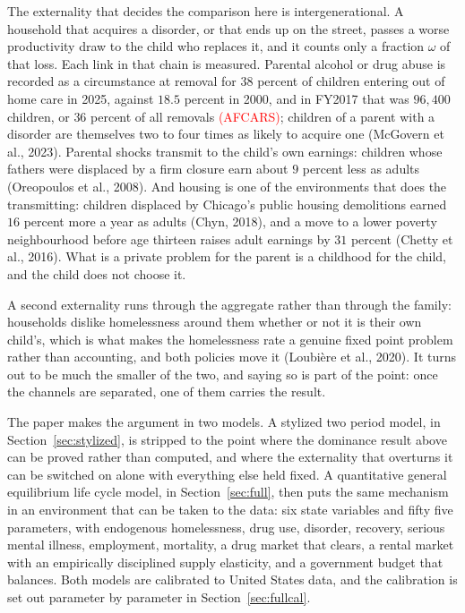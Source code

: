 \documentclass[10pt]{article}
\begin{document}
The externality that decides the comparison here is intergenerational. A
household that acquires a disorder, or that ends up on the street, passes a worse
productivity draw to the child who replaces it, and it counts only a fraction
$\omega$ of that loss. Each link in that chain is measured. Parental alcohol or
drug abuse is recorded as a circumstance at removal for $38$ percent of children
entering out of home care in 2025, against $18.5$ percent in 2000, and in FY2017
that was $96{,}400$ children, or $36$ percent of all removals \textcolor{red}{(AFCARS)}; children of a parent
with a disorder are themselves two to four times as likely to acquire one
(McGovern et al., 2023). Parental shocks transmit to the child's own earnings:
children whose fathers were displaced by a firm closure earn about $9$ percent
less as adults (Oreopoulos et al., 2008). And housing is one of the
environments that does the transmitting: children displaced by Chicago's public
housing demolitions earned $16$ percent more a year as adults (Chyn, 2018), and a
move to a lower poverty neighbourhood before age thirteen raises adult earnings by
$31$ percent (Chetty et al., 2016). What is a private problem for the
parent is a childhood for the child, and the child does not choose it.



A second externality runs through the aggregate rather than through the family:
households dislike homelessness around them whether or not it is their own child's,
which is what makes the homelessness rate a genuine fixed point problem rather than
accounting, and both policies move it (Loubi\`ere et al., 2020). It turns out to be
much the smaller of the two, and saying so is part of the point: once the channels
are separated, one of them carries the result.



The paper makes the argument in two models. A stylized two period model, in
Section~\ref{sec:stylized}, is stripped to the point where the dominance result
above can be proved rather than computed, and where the externality that overturns
it can be switched on alone with everything else held fixed. A quantitative general
equilibrium life cycle model, in Section~\ref{sec:full}, then puts the same
mechanism in an environment that can be taken to the data: six state variables and
fifty five parameters, with endogenous homelessness, drug use, disorder, recovery,
serious mental illness, employment, mortality, a drug market that clears, a rental
market with an empirically disciplined supply elasticity, and a government budget
that balances. Both models are calibrated to United States data, and the
calibration is set out parameter by parameter in Section~\ref{sec:fullcal}.
\end{document}
